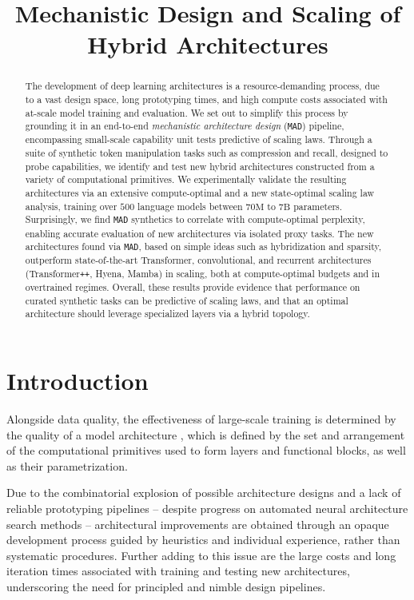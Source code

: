 \title{Mechanistic Design and Scaling of Hybrid Architectures}

\begin{abstract}
The development of deep learning architectures is a resource-demanding process, due to a vast design space, long prototyping times, and high compute costs associated with at-scale model training and evaluation. We set out to simplify this process by grounding it in an end-to-end \textit{mechanistic architecture design} ({\tt MAD}) pipeline, encompassing small-scale capability unit tests predictive of scaling laws. Through a suite of synthetic token manipulation tasks such as compression and recall, designed to probe capabilities, we identify and test new hybrid architectures constructed from a variety of computational primitives. We experimentally validate the resulting architectures via an extensive compute-optimal and a new state-optimal scaling law analysis, training over $500$ language models between $70\text{M}$ to $7\text{B}$ parameters. Surprisingly, we find {\tt MAD} synthetics to correlate with compute-optimal perplexity, enabling accurate evaluation of new architectures via isolated proxy tasks. The new architectures found via {\tt MAD}, based on simple ideas such as hybridization and sparsity, outperform state-of-the-art Transformer, convolutional, and recurrent architectures (Transformer{\tt ++}, Hyena, Mamba) in scaling, both at compute-optimal budgets and in overtrained regimes. Overall, these results provide evidence that performance on curated synthetic tasks can be predictive of scaling laws, and that an optimal architecture should leverage specialized layers via a hybrid topology.
\end{abstract}

\section{Introduction}

Alongside data quality, the effectiveness of large-scale training is determined by the quality of a model architecture \cite{kaplan2020scaling,hoffmann2022training}, which is defined by the set and arrangement of the computational primitives used to form layers and functional blocks, as well as their parametrization.

Due to the combinatorial explosion of possible architecture designs and a lack of reliable prototyping pipelines -- despite progress on automated neural architecture search methods \cite{white2023neural} -- architectural improvements are obtained through an opaque development process guided by heuristics and individual experience, rather than systematic procedures. Further adding to this issue are the large costs and long iteration times associated with training and testing new architectures, underscoring the need for principled and nimble design pipelines. 

